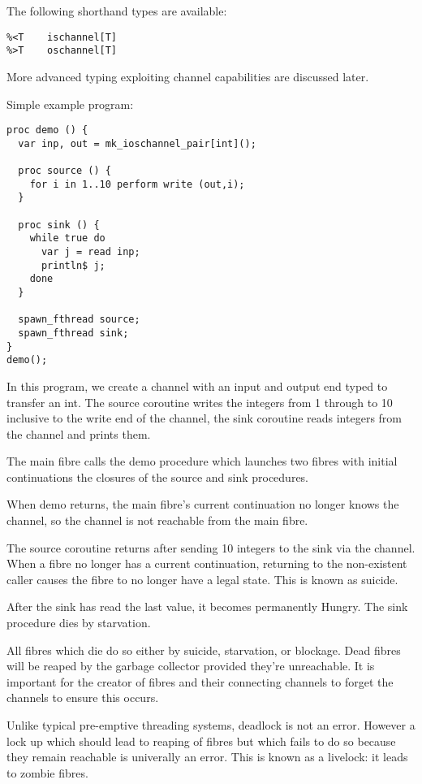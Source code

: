 \documentclass[oneside]{book}
\begin{document}
The following shorthand types are available:

\begin{verbatim}
%<T    ischannel[T]
%>T    oschannel[T]
\end{verbatim}

More advanced typing exploiting channel capabilities are
discussed later.

Simple example program:

\begin{verbatim}
proc demo () {
  var inp, out = mk_ioschannel_pair[int]();

  proc source () {
    for i in 1..10 perform write (out,i);
  }

  proc sink () {
    while true do
      var j = read inp;
      println$ j;
    done
  }

  spawn_fthread source;
  spawn_fthread sink;
}
demo();
\end{verbatim}

In this program, we create a channel with an input and
output end typed to transfer an int. The source coroutine
writes the integers from 1 through to 10 inclusive to
the write end of the channel, the sink coroutine
reads integers from the channel and prints them.

The main fibre calls the demo procedure which launches
two fibres with initial continuations the closures of
the source and sink procedures.

When demo returns, the main fibre's current continuation
no longer knows the channel, so the channel is not reachable
from the main fibre. 

The source coroutine returns after sending 10 integers to
the sink via the channel.  When a fibre no longer has
a current continuation, returning to the non-existent
caller causes the fibre to no longer have a legal
state. This is known as suicide.

After the sink has read the 
last value, it becomes permanently Hungry. The sink 
procedure dies by starvation.

All fibres which die do so either by suicide, starvation,
or blockage. Dead fibres will be reaped by the garbage
collector provided they're unreachable. It is important
for the creator of fibres and their connecting channels
to forget the channels to ensure this occurs.

Unlike typical pre-emptive threading systems, deadlock
is not an error. However a lock up which should lead to
reaping of fibres but which fails to do so because
they remain reachable is univerally an error. This is
known as a livelock: it leads to zombie fibres.
\end{document}
